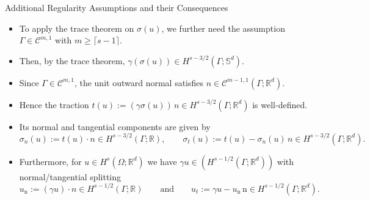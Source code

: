 \documentclass[10pt,aspectratio=169]{beamer}
\def\R{{\mathbb R}}
\def\cC{{\mathcal C}}
\begin{document}
\begin{frame}{Additional Regularity Assumptions and their Consequences}
	\begin{itemize}
		\item To apply the trace theorem on $\sigma(u)$, we further need the assumption $\Gamma\in \cC^{m,1}$ with $m\ge \lceil s-1\rceil$.
		\item Then, by the trace theorem, $\gamma(\sigma(u))\in H^{s-3/2}(\Gamma;\mathbb S^d)$.
		\item Since $\Gamma\in \mathcal C^{m,1}$, the unit outward normal satisfies $n\in \mathcal C^{m-1,1}(\Gamma;\R^d)$.
		\item Hence the traction $t(u):=(\gamma \sigma(u))\,n\in H^{s-3/2}(\Gamma;\R^d)$ is well-defined.
		\item Its normal and tangential components are given by
		      \begin{equation*}
			      \sigma_n(u):=t(u)\cdot n\in H^{s-3/2}(\Gamma;\R),
			      \qquad
			      \sigma_t(u):=t(u)-\sigma_n(u)\,n\in H^{s-3/2}(\Gamma;\R^d).
		      \end{equation*}
		\item Furthermore, for $u\in H^{s}(\Omega;\R^d)$ we have $\gamma u\in (H^{s-1/2}(\Gamma;\R^d))$ with normal/tangential splitting
		      \begin{equation*}
			      u_\mathrm{n}:= (\gamma u)\cdot n\in H^{s-1/2}(\Gamma;\R)\qquad\text{and}\qquad u_t:= \gamma u- u_\mathrm{n}\,\mathrm{n}\in H^{s-1/2}(\Gamma;\R^d).
		      \end{equation*}
	\end{itemize}
\end{frame}
\end{document}
